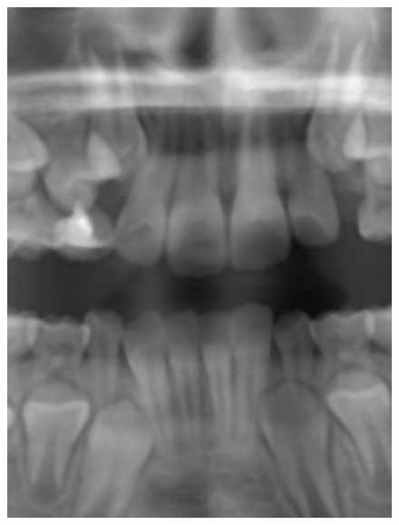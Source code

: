 \documentclass[a4paper,titlepage,12pt]{article}
\begin{document}
\begin{figure}
\begin{minipage}[b]{0.32\linewidth}
		\includegraphics[width=\linewidth]{preprocess/bilateral.png}
	\end{minipage}
	\begin{minipage}[b]{0.32\linewidth}

\end{minipage}
\end{figure}
\end{document}
